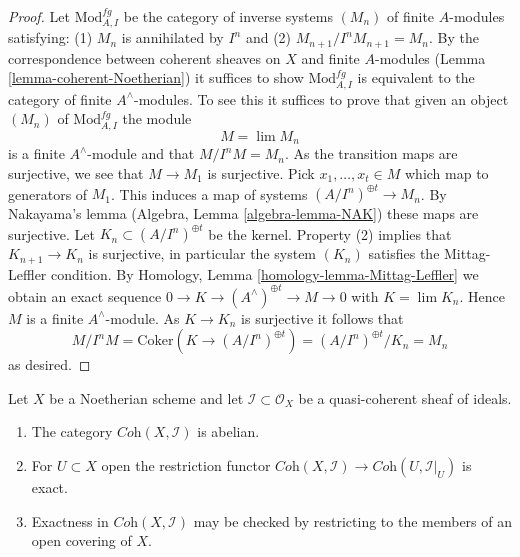 \begin{proof}
Let $\text{Mod}^{fg}_{A, I}$ be the category of inverse systems $(M_n)$
of finite $A$-modules satisfying: (1) $M_n$ is annihilated by $I^n$ and (2)
$M_{n + 1}/I^nM_{n + 1} = M_n$. By the correspondence between coherent
sheaves on $X$ and finite $A$-modules (Lemma \ref{lemma-coherent-Noetherian})
it suffices to show $\text{Mod}^{fg}_{A, I}$ is equivalent to the category of
finite $A^\wedge$-modules. To see this it suffices to prove that given
an object $(M_n)$ of $\text{Mod}^{fg}_{A, I}$ the module
$$
M = \lim M_n
$$
is a finite $A^\wedge$-module and that $M/I^nM = M_n$. As the transition
maps are surjective, we see that $M \to M_1$ is surjective.
Pick $x_1, \ldots, x_t \in M$ which map to generators of $M_1$.
This induces a map of systems $(A/I^n)^{\oplus t} \to M_n$.
By Nakayama's lemma (Algebra, Lemma \ref{algebra-lemma-NAK}) these maps are
surjective. Let $K_n \subset (A/I^n)^{\oplus t}$ be the kernel.
Property (2) implies that $K_{n + 1} \to K_n$ is surjective, in particular
the system $(K_n)$ satisfies the Mittag-Leffler condition.
By Homology, Lemma \ref{homology-lemma-Mittag-Leffler}
we obtain an exact sequence
$0 \to K \to (A^\wedge)^{\oplus t} \to M \to 0$
with $K = \lim K_n$.
Hence $M$ is a finite $A^\wedge$-module.
As $K \to K_n$ is surjective it follows that
$$
M/I^nM = \text{Coker}(K \to (A/I^n)^{\oplus t}) =
(A/I^n)^{\oplus t}/K_n = M_n
$$
as desired.
\end{proof}

\begin{lemma}
\label{lemma-inverse-systems-abelian}
Let $X$ be a Noetherian scheme and let $\mathcal{I} \subset \mathcal{O}_X$
be a quasi-coherent sheaf of ideals.
\begin{enumerate}
\item The category $\textit{Coh}(X, \mathcal{I})$ is abelian.
\item For $U \subset X$ open the restriction functor
$\textit{Coh}(X, \mathcal{I}) \to \textit{Coh}(U, \mathcal{I}|_U)$
is exact.
\item Exactness in $\textit{Coh}(X, \mathcal{I})$ may be checked by
restricting to the members of an open covering of $X$.
\end{enumerate}
\end{lemma}

